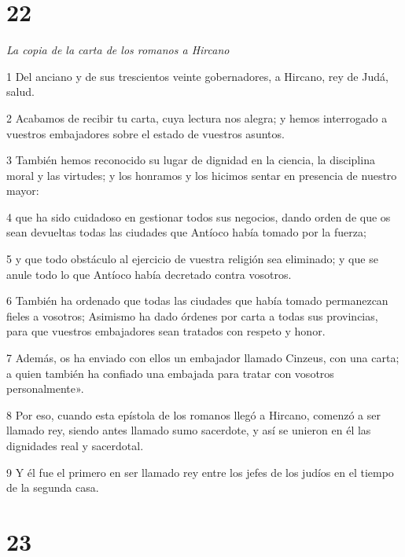 \chapter{22}

\textit{La copia de la carta de los romanos a Hircano}

\par 1 Del anciano y de sus trescientos veinte gobernadores, a Hircano, rey de Judá, salud.

\par 2 Acabamos de recibir tu carta, cuya lectura nos alegra; y hemos interrogado a vuestros embajadores sobre el estado de vuestros asuntos.

\par 3 También hemos reconocido su lugar de dignidad en la ciencia, la disciplina moral y las virtudes; y los honramos y los hicimos sentar en presencia de nuestro mayor:

\par 4 que ha sido cuidadoso en gestionar todos sus negocios, dando orden de que os sean devueltas todas las ciudades que Antíoco había tomado por la fuerza;

\par 5 y que todo obstáculo al ejercicio de vuestra religión sea eliminado; y que se anule todo lo que Antíoco había decretado contra vosotros.

\par 6 También ha ordenado que todas las ciudades que había tomado permanezcan fieles a vosotros; Asimismo ha dado órdenes por carta a todas sus provincias, para que vuestros embajadores sean tratados con respeto y honor.

\par 7 Además, os ha enviado con ellos un embajador llamado Cinzeus, con una carta; a quien también ha confiado una embajada para tratar con vosotros personalmente».

\par 8 Por eso, cuando esta epístola de los romanos llegó a Hircano, comenzó a ser llamado rey, siendo antes llamado sumo sacerdote, y así se unieron en él las dignidades real y sacerdotal.

\par 9 Y él fue el primero en ser llamado rey entre los jefes de los judíos en el tiempo de la segunda casa.


\chapter{23}

